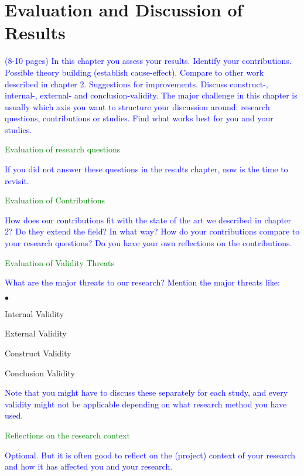 \chapter{Evaluation and Discussion of Results}


\textcolor{blue}{(8-10 pages) In this chapter you assess your results. Identify your contributions. Possible theory 
building (establish cause-effect). Compare to other work described in chapter 2. Suggestions for improvements. Discuss 
construct-, internal-, external- and conclusion-validity. The major challenge in this chapter is usually which axis you 
want to structure your discussion around: research questions, contributions or studies. Find what works best for you 
and your studies.}

\textcolor{green}{Evaluation of research questions}

\textcolor{blue}{If you did not answer these questions in the results chapter, now is the time to revisit.}

\textcolor{green}{Evaluation of Contributions}

\textcolor{blue}{How does our contributions fit with the state of the art we described in chapter 2? Do they extend the 
field? In what way? How do your contributions compare to your research questions? Do you have your own reflections on 
the contributions.}

\textcolor{green}{Evaluation of Validity Threats}

\textcolor{blue}{What are the major threats to our research? Mention the major threats like:}

\begin{list}{$\bullet$}{}
  \item Internal Validity 
  \item External Validity
  \item Construct Validity
  \item Conclusion Validity
\end{list}

\textcolor{blue}{Note that you might have to discuss these separately for each study, and every validity might not be applicable depending on what research method you have used.}

\textcolor{green}{Reflections on the research context}

\textcolor{blue}{Optional. But it is often good to reflect on the (project) context of your research and how it has 
affected you and your research.}